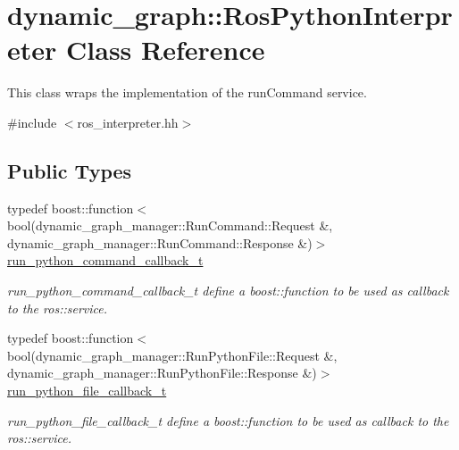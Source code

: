 \hypertarget{classdynamic__graph_1_1RosPythonInterpreter}{}\section{dynamic\+\_\+graph\+:\+:Ros\+Python\+Interpreter Class Reference}
\label{classdynamic__graph_1_1RosPythonInterpreter}


This class wraps the implementation of the run\+Command service.  




{\ttfamily \#include $<$ros\+\_\+interpreter.\+hh$>$}

\subsection*{Public Types}
\begin{DoxyCompactItemize}
\item 
typedef boost\+::function$<$ bool(dynamic\+\_\+graph\+\_\+manager\+::\+Run\+Command\+::\+Request \&, dynamic\+\_\+graph\+\_\+manager\+::\+Run\+Command\+::\+Response \&)$>$ \hyperlink{classdynamic__graph_1_1RosPythonInterpreter_a4ae104e908148e26f0d9c46357ecaf89}{run\+\_\+python\+\_\+command\+\_\+callback\+\_\+t}
\begin{DoxyCompactList}\small\item\em run\+\_\+python\+\_\+command\+\_\+callback\+\_\+t define a boost\+::function to be used as callback to the ros\+::service. \end{DoxyCompactList}\item 
typedef boost\+::function$<$ bool(dynamic\+\_\+graph\+\_\+manager\+::\+Run\+Python\+File\+::\+Request \&, dynamic\+\_\+graph\+\_\+manager\+::\+Run\+Python\+File\+::\+Response \&)$>$ \hyperlink{classdynamic__graph_1_1RosPythonInterpreter_a7beecaa90bafc03798fd907da9690654}{run\+\_\+python\+\_\+file\+\_\+callback\+\_\+t}
\begin{DoxyCompactList}\small\item\em run\+\_\+python\+\_\+file\+\_\+callback\+\_\+t define a boost\+::function to be used as callback to the ros\+::service. \end{DoxyCompactList}\end{DoxyCompactItemize}
